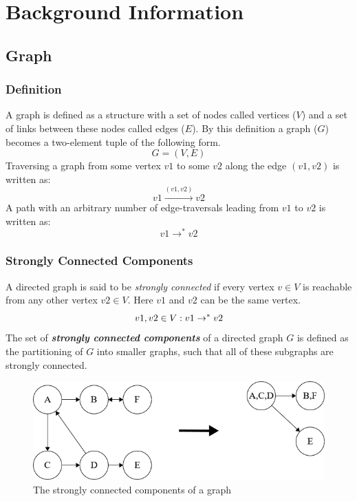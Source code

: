 
\chapter{Background Information} %

\label{chap:Background} %



\section{Graph}
	\subsection{Definition}
	A graph is defined as a structure with a set of nodes called vertices ($V$) and a set of links between these nodes called edges ($E$). By this definition a graph ($G$) becomes a two-element tuple of the following form.
	\begin{equation} G = (V, E) \end{equation}	
	Traversing a graph from some vertex $v1$ to some $v2$ along the edge $(v1, v2)$ is written as:
	\begin{equation} v1 \stackrel{(v1, v2)}{\to} v2 \end{equation}
	A path with an arbitrary number of edge-traversals leading from $v1$ to $v2$ is written as:
	\begin{equation} v1 \to^* v2 \end{equation}
	
	\subsection{Strongly Connected Components}
	A directed graph is said to be \emph{strongly connected} if every vertex $v \in V$ is reachable from any other vertex $v2 \in V$. Here $v1$ and $v2$ can be the same vertex.
	\begin{equation}v1, v2 \in V : v1 \rightarrow^* v2\end{equation}
	The set of \emph{\textbf{strongly connected components}} of a directed graph $G$ is defined as the partitioning of $G$ into smaller graphs, such that all of these subgraphs are strongly connected.
	\begin{figure}[h]
		\centering
		\includegraphics[scale=0.6]{Figures/components.png}
		\decoRule
	 	\caption[Strongly connected components]{The strongly connected components of a graph}
	 	\label{fig:GraphExample}
	\end{figure}
	

